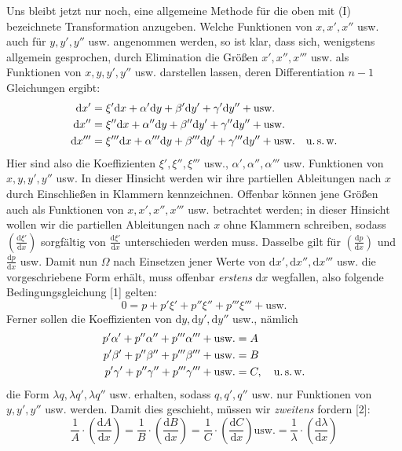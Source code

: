 Uns bleibt jetzt nur noch, eine allgemeine Methode%
 für die oben mit (I) bezeichnete Transformation anzugeben. Welche Funktionen von $x,x',x''$ usw. auch für $y,y',y''$ usw. angenommen werden, so ist klar, dass sich, wenigstens allgemein gesprochen, durch Elimination die Größen $x',x'',x'''$ usw. als Funktionen von $x,y,y',y''$ usw. darstellen lassen, deren Differentiation $n-1$ Gleichungen ergibt:
\[
\begin{aligned}
\mathrm{d}x'&=\xi'\mathrm{d}x+\alpha'\mathrm{d}y+\beta'\mathrm{d}y'+\gamma'\mathrm{d}y''+\text{usw.}\\
\mathrm{d}x''&=\xi''\mathrm{d}x+\alpha''\mathrm{d}y+\beta''\mathrm{d}y'+\gamma''\mathrm{d}y''+\text{usw.}\\
\mathrm{d}x'''&=\xi'''\mathrm{d}x+\alpha'''\mathrm{d}y+\beta'''\mathrm{d}y'+\gamma'''\mathrm{d}y''+\text{usw.}\quad\text{u.\,s.\,w.}
\end{aligned}
\]
Hier sind also die Koeffizienten $\xi',\xi'',\xi'''$ usw., $\alpha',\alpha'',\alpha'''$ usw. Funktionen von $x,y,y',y''$ usw. In dieser Hinsicht werden wir ihre partiellen Ableitungen nach $x$ durch Einschließen in Klammern kennzeichnen. Offenbar können jene Größen auch als Funktionen von $x,x',x'',x'''$ usw. betrachtet werden; in dieser Hinsicht wollen wir die partiellen Ableitungen nach $x$ ohne Klammern schreiben, sodass $\left(\frac{\mathrm{d}\xi'}{\mathrm{d}x}\right)$ sorgfältig von $\frac{\mathrm{d}\xi'}{\mathrm{d}x}$ unterschieden werden muss. Dasselbe gilt für $\left(\frac{\mathrm{d}p}{\mathrm{d}x}\right)$ und $\frac{\mathrm{d}p}{\mathrm{d}x}$ usw. Damit nun $\Omega$ nach Einsetzen jener Werte von $\mathrm{d}x',\mathrm{d}x'',\mathrm{d}x'''$ usw. die vorgeschriebene Form erhält, muss offenbar \emph{erstens} $\mathrm{d}x$ wegfallen, also folgende Bedingungsgleichung [1] gelten:
\[
0=p+p'\xi'+p''\xi''+p'''\xi'''+\text{usw.}
\]
Ferner sollen die Koeffizienten von $\mathrm{d}y,\mathrm{d}y',\mathrm{d}y''$ usw., nämlich
\[
\begin{aligned}
p'\alpha'+p''\alpha''+p'''\alpha'''+\text{usw.}&=A\\
p'\beta'+p''\beta''+p'''\beta'''+\text{usw.}&=B\\
p'\gamma'+p''\gamma''+p'''\gamma'''+\text{usw.}&=C,\quad\text{u.\,s.\,w.}
\end{aligned}
\]
die Form $\lambda q,\lambda q',\lambda q''$ usw. erhalten, sodass $q,q',q''$ usw. nur Funktionen von $y,y',y''$ usw. werden. Damit dies geschieht, müssen wir \emph{zweitens} fordern [2]:
\[
\frac{1}{A}\cdot\left(\frac{\mathrm{d}A}{\mathrm{d}x}\right)
=\frac{1}{B}\cdot\left(\frac{\mathrm{d}B}{\mathrm{d}x}\right)
=\frac{1}{C}\cdot\left(\frac{\mathrm{d}C}{\mathrm{d}x}\right)\text{usw.}
=\frac{1}{\lambda}\cdot\left(\frac{\mathrm{d}\lambda}{\mathrm{d}x}\right)
\]
